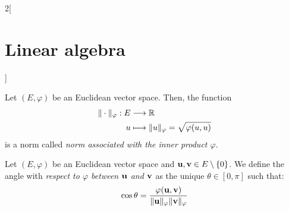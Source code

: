 \documentclass[../../../main.tex]{subfiles}
\begin{document}
\begin{multicols}{2}[\section{Linear algebra}]
\begin{definition}
\begin{enumerate}
    \end{enumerate}
\end{definition}
\begin{prop}
    Let $(E,\varphi)$ be an Euclidean vector space. Then, the function
    \begin{align*}
        \|\cdot\|_\varphi:E&\longrightarrow\mathbb{R}\\
        u&\longmapsto\|u\|_\varphi=\sqrt{\varphi(u,u)}
    \end{align*}
    is a norm called \textit{norm associated with the inner product $\varphi$}.
\end{prop}
\begin{definition}
    Let $(E,\varphi)$ be an Euclidean vector space and $\vb{u},\vb{v}\in E\setminus\{0\}$. We define the angle with \textit{respect to $\varphi$ between $\vb{u}$ and $\vb{v}$} as the unique $\theta\in[0,\pi]$ such that: $$\cos{\theta}=\frac{\varphi(\vb{u},\vb{v})}{\|\vb{u}\|_\varphi\|\vb{v}\|_\varphi}$$
\end{definition}

\end{multicols}
\end{document}
